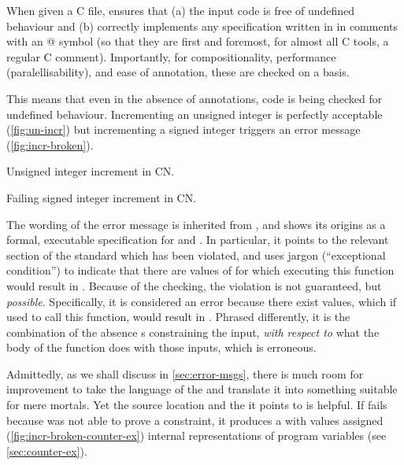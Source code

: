 When given a C file,  ensures that (a) the input code is free of
undefined behaviour and (b) correctly implements any specification written in
 in comments with an @ symbol 
(so that they are first and foremost, for almost all C tools, a regular C
comment). Importantly, for compositionality, performance (paralellisability),
and ease of annotation, these are checked on a  basis.

This means that even in the absence of annotations, code is being checked for
undefined behaviour. Incrementing an unsigned integer is perfectly acceptable
(\cref{fig:un-incr}) but incrementing a signed integer triggers an error message
(\cref{fig:incr-broken}).

\begin{marginfigure}
    \centering
    \caption{Unsigned integer increment in CN.}\label{fig:un-incr}
\end{marginfigure}%

\begin{marginfigure}
    \centering
    \caption{Failing signed integer increment in CN.}\label{fig:incr-broken}
\end{marginfigure}%

The wording of the error message is inherited from , and shows its
origins as a formal, executable specification for  and 
. In particular, it points to the relevant section of the standard which
has been violated, and uses jargon (``exceptional condition'') to indicate that
there are values of  for which executing this function would result
in . Because of the  checking, the violation is not
guaranteed, but \emph{possible}. Specifically, it is considered an error
because there exist values, which if used to call this function, would result
in . Phrased differently, it is the combination of the absence
s constraining the input, \emph{with respect to} what the body
of the function does with those inputs, which is erroneous.

Admittedly, as we shall discuss in \cref{sec:error-msgs}, there is much room
for improvement to take the language of the  and
translate it into something suitable for mere mortals. Yet the source location
and the  it points to is helpful. If  fails
because  was not able to prove a constraint, it produces a
 with values assigned (\cref{fig:incr-broken-counter-ex})
internal representations of program variables (see \cref{sec:counter-ex}).

